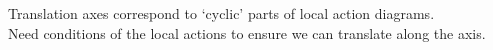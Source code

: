 \documentclass[preview]{standalone}
\begin{document}
Translation axes correspond to `cyclic' parts of local action diagrams.\\Need conditions of the local actions to ensure we can translate along the axis.\\
\end{document}

